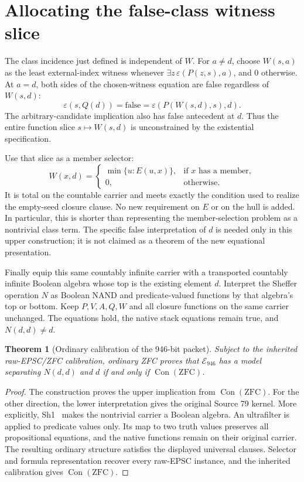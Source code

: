 \documentclass[11pt]{article}
\newtheorem{theorem}{Theorem}
\newcommand{\eps}{\varepsilon}
\newcommand{\Con}{\operatorname{Con}}
\begin{document}
\section{Allocating the false-class witness slice}

The class incidence just defined is independent of $W$. For $a\ne d$,
choose $W(s,a)$ as the least external-index witness whenever
$\exists z\,\eps(P(z,s),a)$, and 0 otherwise. At $a=d$, both sides of
the chosen-witness equation are false regardless of $W(s,d)$:
\[
 \eps(s,Q(d))=\text{false}
       =\eps(P(W(s,d),s),d).
\]
The arbitrary-candidate implication also has false antecedent at $d$.
Thus the entire function slice $s\mapsto W(s,d)$ is unconstrained by
the existential specification.

Use that slice as a member selector:
\[
 W(x,d)=
 \begin{cases}
  \min\{u:E(u,x)\},&\text{if $x$ has a member},\\
  0,&\text{otherwise}.
 \end{cases}
\]
It is total on the countable carrier and meets exactly the condition used
to realize the empty-seed closure clause. No new requirement on $E$ or
on the hull is added. In particular, this is shorter than representing
the member-selection problem as a nontrivial class term. The specific
false interpretation of $d$ is needed only in this upper construction;
it is not claimed as a theorem of the new equational presentation.

Finally equip this same countably infinite carrier with a transported
countably infinite Boolean algebra whose top is the existing element $d$.
Interpret the Sheffer operation $N$ as Boolean NAND and predicate-valued
functions by that algebra's top or bottom. Keep $P,V,A,Q,W$ and all closure
functions on the same carrier unchanged. The equations hold, the native
stack equations remain true, and $N(d,d)\ne d$.

\begin{theorem}[Ordinary calibration of the 946-bit packet]
Subject to the inherited raw-EPSC/ZFC calibration,
ordinary ZFC proves that $\mathcal E_{946}$ has a model separating
$N(d,d)$ and $d$ if and only if $\Con(\mathrm{ZFC})$.
\end{theorem}
\begin{proof}
The construction proves the upper implication from $\Con(\mathrm{ZFC})$.
For the other direction, the lower interpretation gives the original
Source 79 kernel. More explicitly, Sh1~\cite{sh1} makes the nontrivial
carrier a Boolean algebra. An ultrafilter is applied to predicate values
only. Its map to two truth values preserves all propositional equations,
and the native functions remain on their original carrier. The resulting
ordinary structure satisfies the displayed universal clauses. Selector and
formula representation recover every raw-EPSC instance, and the inherited
calibration gives $\Con(\mathrm{ZFC})$.
\end{proof}
\end{document}
